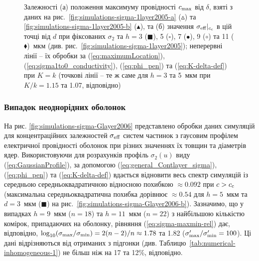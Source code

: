\documentclass[14pt,twoside]{vakthesis}
\begin{document}
\begin{figure}[tb]
	\caption{\label{fig:simulations-max-1layer2005} 
		Залежності \cite{Siekierski2005} (а) положення максимуму провідності $c_{\rm max}$ від $\delta$, взяті з даних на рис.~\ref{fig:simulations-sigma-1layer2005-a} ($\vartriangle$) та \ref{fig:simulations-sigma-1layer2005-b} ($\blacktriangle$), та (б) значення $\sigma_{\rm eff}|_{c_{\rm c}}$ в цій точці від $d$ при фіксованих $\sigma_2$ та $h = 3$ ($\blacksquare$), 5 ($\square$), 7 ($\bullet$), 9 ($\circ$) та 11 ($\blacklozenge$)~мкм (див. рис.~\ref{fig:simulations-sigma-1layer2005}); неперервні лінії -- їх обробки за (\ref{eq:maximumLocation}), (\ref{eq:sigma1to0_conductivity}),  (\ref{eq:phi_pen}) та (\ref{eq:K-delta-def}) при $K=k$ (точкові лінії -- те ж саме для $h = 3$ та 5~мкм при $K/k = 1.15$ та 1.07, відповідно)}
\end{figure}

\subsubsection{Випадок неоднорідних оболонок}

На рис. \ref{fig:simulations-sigma-Glayer2006} представлено обробки даних симуляцій \cite{Siekierski2006} для концентраційних залежностей $\sigma_{\rm eff}$ систем частинок з гаусовим профілем електричної провідності оболонок при різних значеннях їх товщин та діаметрів ядер. Використовуючи для розрахунків профіль $\sigma_2(u)$ виду (\ref{eq:GaussianProfile}), за допомогою (\ref{eq:general_Contlayer_sigma}), (\ref{eq:phi_pen}) та (\ref{eq:K-delta-def}) вдається відновити весь спектр симуляцій {\color{violet}із середньою середньоквадратичною відносною похибкою $\approx 0.092$ при $c > c_{\rm c}$
(максимальна середньоквадратична похибка дорівнює $\approx 0.54$ для $h=5$~мкм та $d=3$~мкм ($\blacksquare$) на рис.~\ref{fig:simulations-sigma-Glayer2006-b})}.
Зазначимо, що у випадках $h = 9$~мкм ($n = 18$) та $h = 11$~мкм ($n = 22$) з найбільшою кількістю комірок, припадаючих на оболонку, рівняння (\ref{eq:sigma-maxmin-rel}) дає, відповідно, $\log_{10} (\sigma_{\rm max}/\sigma_{\rm min}) = 2(n-2)/n \approx 1.78$ та 1.82  ($\sigma'_{\rm max}/\sigma'_{\rm min} = 100$). Ці дані відрізняються від отриманих з підгонки (див. Таблицю~\ref{tab:numerical-inhomogeneous-1}) не більш ніж на 17 та 12\%, відповідно. 
\end{document}
